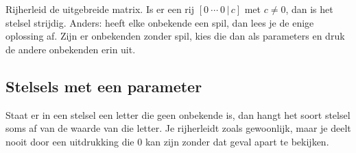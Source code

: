 \begin{werkwijze}
Rijherleid de uitgebreide matrix. Is er een rij $[0 \ \cdots \ 0 \,|\, c]$ met $c \neq 0$, dan is het stelsel strijdig. Anders: heeft elke onbekende een spil, dan lees je de enige oplossing af. Zijn er onbekenden zonder spil, kies die dan als parameters en druk de andere onbekenden erin uit.
\end{werkwijze}


\begin{oefeningen}

\end{oefeningen}

\subsection{Stelsels met een parameter}

Staat er in een stelsel een letter die geen onbekende is, dan hangt het soort stelsel soms af van de waarde van die letter. Je rijherleidt zoals gewoonlijk, maar je deelt nooit door een uitdrukking die 0 kan zijn zonder dat geval apart te bekijken.

